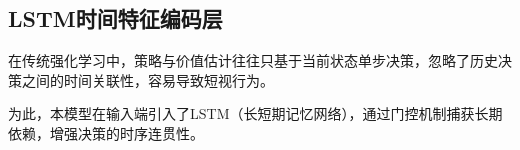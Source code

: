 
\subsection{LSTM时间特征编码层}

在传统强化学习中，策略与价值估计往往只基于当前状态单步决策，忽略了历史决策之间的时间关联性，容易导致短视行为。


为此，本模型在输入端引入了LSTM（长短期记忆网络），通过门控机制捕获长期依赖，增强决策的时序连贯性。



